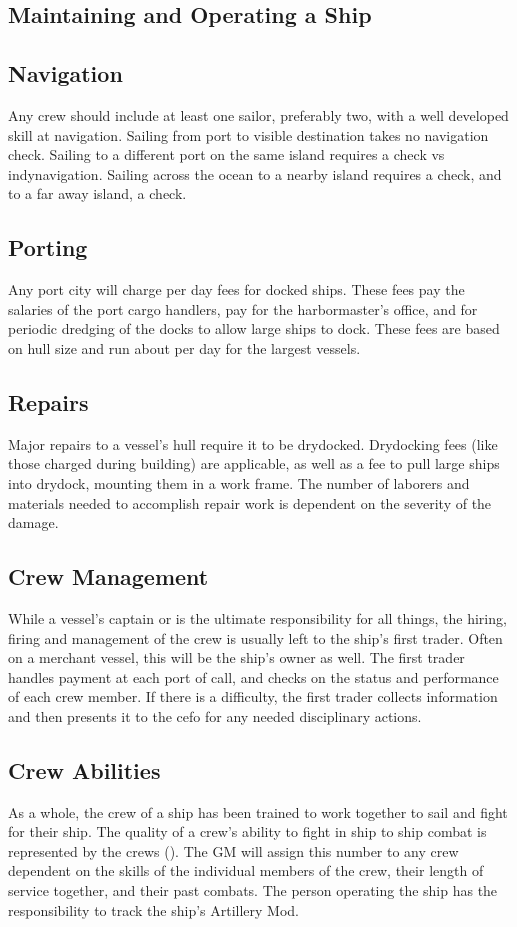 \begin{multicols*}{2}
\section{Maintaining and Operating a Ship}
\subsection{Navigation}
Any crew should include at least one sailor, preferably two, with a well developed skill at navigation. Sailing from port to visible destination takes no navigation check. Sailing to a different port on the same island requires a  check vs indy{navigation}. Sailing across the ocean to a nearby island requires a  check, and to a far away island, a  check.
\subsection{Porting}
Any port city will charge per day fees for docked ships. These fees pay the salaries of the port cargo handlers, pay for the harbormaster’s office, and for periodic dredging of the docks to allow large ships to dock. These fees are based on hull size and run about \result{100 sp} per day for the largest vessels.
\subsection{Repairs}
Major repairs to a vessel’s hull require it to be drydocked. Drydocking fees (like those charged during building) are applicable, as well as a  fee to pull large ships into drydock, mounting them in a work frame. The number of laborers and materials needed to accomplish repair work is dependent on the severity of the damage.
\subsection{Crew Management}
While a vessel’s captain or  is the ultimate responsibility for all things, the hiring, firing and management of the crew is usually left to the ship’s first trader. Often on a merchant vessel, this will be the ship’s owner as well. The first trader handles payment at each port of call, and checks on the status and performance of each crew member. If there is a difficulty, the first trader collects information and then presents it to the cefo for any needed disciplinary actions.
\subsection{Crew Abilities}
As a whole, the crew of a ship has been trained to work together to sail and fight for their ship. The quality of a crew’s ability to fight in ship to ship combat is represented by
the crews  (\AM). The GM will assign this number to any crew dependent on the skills of the individual members of the crew, their length of service together, and their past combats. The person operating the ship has the responsibility to track the ship’s Artillery Mod.

\end{multicols*}

